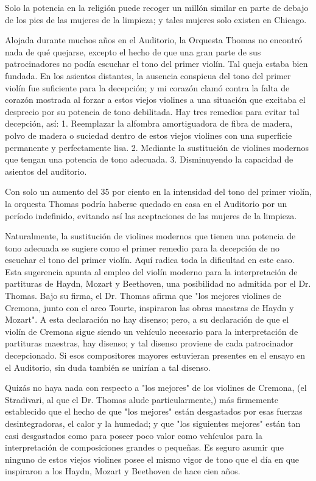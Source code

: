 \documentclass[12pt]{book}
\begin{document}
Solo la potencia en la religión puede recoger un millón similar en parte de debajo de los pies de las mujeres de la limpieza; y tales mujeres solo existen en Chicago.

Alojada durante muchos años en el Auditorio, la Orquesta Thomas no encontró nada de qué quejarse, excepto el hecho de que una gran parte de sus patrocinadores no podía escuchar el tono del primer violín. Tal queja estaba bien fundada. En los asientos distantes, la ausencia conspicua del tono del primer violín fue suficiente para la decepción; y mi corazón clamó contra la falta de corazón mostrada al forzar a estos viejos violines a una situación que excitaba el desprecio por su potencia de tono debilitada. Hay tres remedios para evitar tal decepción, así: 1. Reemplazar la alfombra amortiguadora de fibra de madera, polvo de madera o suciedad dentro de estos viejos violines con una superficie permanente y perfectamente lisa. 2. Mediante la sustitución de violines modernos que tengan una potencia de tono adecuada. 3. Disminuyendo la capacidad de asientos del auditorio.

Con solo un aumento del 35 por ciento en la intensidad del tono del primer violín, la orquesta Thomas podría haberse quedado en casa en el Auditorio por un período indefinido, evitando así las aceptaciones de las mujeres de la limpieza.

Naturalmente, la sustitución de violines modernos que tienen una potencia de tono adecuada se sugiere como el primer remedio para la decepción de no escuchar el tono del primer violín. Aquí radica toda la dificultad en este caso. Esta sugerencia apunta al empleo del violín moderno para la interpretación de partituras de Haydn, Mozart y Beethoven, una posibilidad no admitida por el Dr. Thomas. Bajo su firma, el Dr. Thomas afirma que "los mejores violines de Cremona, junto con el arco Tourte, inspiraron las obras maestras de Haydn y Mozart". A esta declaración no hay disenso; pero, a su declaración de que el violín de Cremona sigue siendo un vehículo necesario para la interpretación de partituras maestras, hay disenso; y tal disenso proviene de cada patrocinador decepcionado. Si esos compositores mayores estuvieran presentes en el ensayo en el Auditorio, sin duda también se unirían a tal disenso.

Quizás no haya nada con respecto a "los mejores" de los violines de Cremona, (el Stradivari, al que el Dr. Thomas alude particularmente,) más firmemente establecido que el hecho de que "los mejores" están desgastados por esas fuerzas desintegradoras, el calor y la humedad; y que "los siguientes mejores" están tan casi desgastados como para poseer poco valor como vehículos para la interpretación de composiciones grandes o pequeñas. Es seguro asumir que ninguno de estos viejos violines posee el mismo vigor de tono que el día en que inspiraron a los Haydn, Mozart y Beethoven de hace cien años.
\end{document}
